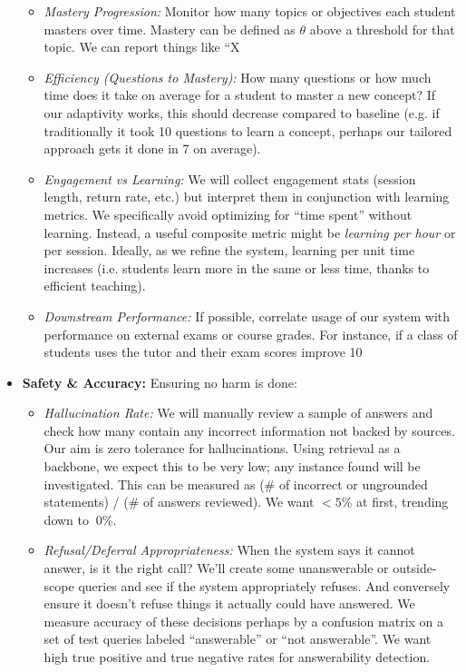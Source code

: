 \documentclass[11pt]{article}
\begin{document}
\begin{itemize}
\begin{itemize}
      \item \textit{Mastery Progression:} Monitor how many topics or objectives each student masters over time. Mastery can be defined as $\theta$ above a threshold for that topic. We can report things like “X%
      \item \textit{Efficiency (Questions to Mastery):} How many questions or how much time does it take on average for a student to master a new concept? If our adaptivity works, this should decrease compared to baseline (e.g. if traditionally it took 10 questions to learn a concept, perhaps our tailored approach gets it done in 7 on average).
      \item \textit{Engagement vs Learning:} We will collect engagement stats (session length, return rate, etc.) but interpret them in conjunction with learning metrics. We specifically avoid optimizing for “time spent” without learning. Instead, a useful composite metric might be \textit{learning per hour} or per session. Ideally, as we refine the system, learning per unit time increases (i.e. students learn more in the same or less time, thanks to efficient teaching).
      \item \textit{Downstream Performance:} If possible, correlate usage of our system with performance on external exams or course grades. For instance, if a class of students uses the tutor and their exam scores improve 10%
    \end{itemize}
  \item \textbf{Safety \& Accuracy:} Ensuring no harm is done:
    \begin{itemize}
      \item \textit{Hallucination Rate:} We will manually review a sample of answers and check how many contain any incorrect information not backed by sources. Our aim is zero tolerance for hallucinations. Using retrieval as a backbone, we expect this to be very low; any instance found will be investigated. This can be measured as (\# of incorrect or ungrounded statements) / (\# of answers reviewed). We want $< 5\%$ at first, trending down to $~0\%$.
      \item \textit{Refusal/Deferral Appropriateness:} When the system says it cannot answer, is it the right call? We’ll create some unanswerable or outside-scope queries and see if the system appropriately refuses. And conversely ensure it doesn’t refuse things it actually could have answered. We measure accuracy of these decisions perhaps by a confusion matrix on a set of test queries labeled “answerable” or “not answerable”. We want high true positive and true negative rates for answerability detection.

\end{itemize}
\end{itemize}
\end{document}
